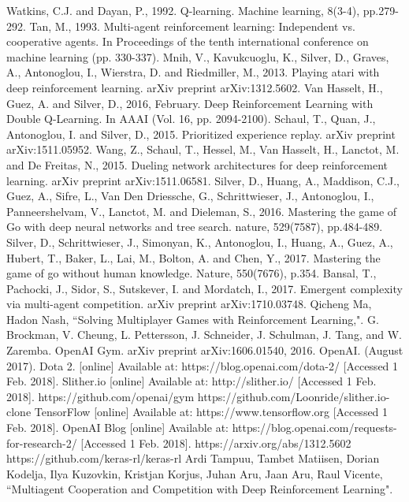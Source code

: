 \documentclass[conference,10pt]{IEEEtran}
\begin{document}
\begin{thebibliography}{00}
 Watkins, C.J. and Dayan, P., 1992. Q-learning. Machine learning, 8(3-4), pp.279-292.
 Tan, M., 1993. Multi-agent reinforcement learning: Independent vs. cooperative agents. In Proceedings of the tenth international conference on machine learning (pp. 330-337).
 Mnih, V., Kavukcuoglu, K., Silver, D., Graves, A., Antonoglou, I., Wierstra, D. and Riedmiller, M., 2013. Playing atari with deep reinforcement learning. arXiv preprint arXiv:1312.5602.
 Van Hasselt, H., Guez, A. and Silver, D., 2016, February. Deep Reinforcement Learning with Double Q-Learning. In AAAI (Vol. 16, pp. 2094-2100).
 Schaul, T., Quan, J., Antonoglou, I. and Silver, D., 2015. Prioritized experience replay. arXiv preprint arXiv:1511.05952.
 Wang, Z., Schaul, T., Hessel, M., Van Hasselt, H., Lanctot, M. and De Freitas, N., 2015. Dueling network architectures for deep reinforcement learning. arXiv preprint arXiv:1511.06581.
 Silver, D., Huang, A., Maddison, C.J., Guez, A., Sifre, L., Van Den Driessche, G., Schrittwieser, J., Antonoglou, I., Panneershelvam, V., Lanctot, M. and Dieleman, S., 2016. Mastering the game of Go with deep neural networks and tree search. nature, 529(7587), pp.484-489.
 Silver, D., Schrittwieser, J., Simonyan, K., Antonoglou, I., Huang, A., Guez, A., Hubert, T., Baker, L., Lai, M., Bolton, A. and Chen, Y., 2017. Mastering the game of go without human knowledge. Nature, 550(7676), p.354.
 Bansal, T., Pachocki, J., Sidor, S., Sutskever, I. and Mordatch, I., 2017. Emergent complexity via multi-agent competition. arXiv preprint arXiv:1710.03748.
 Qicheng Ma, Hadon Nash, ``Solving Multiplayer Games with Reinforcement Learning,".
 G. Brockman, V. Cheung, L. Pettersson, J. Schneider, J. Schulman, J. Tang, and W. Zaremba. OpenAI Gym. arXiv preprint arXiv:1606.01540, 2016.
 OpenAI. (August 2017). Dota 2. [online] Available at: https://blog.openai.com/dota-2/ [Accessed 1 Feb. 2018].
 Slither.io [online] Available at: http://slither.io/ [Accessed 1 Feb. 2018].
https://github.com/openai/gym
https://github.com/Loonride/slither.io-clone
 TensorFlow [online] Available at: https://www.tensorflow.org [Accessed 1 Feb. 2018].
 OpenAI Blog [online] Available at: https://blog.openai.com/requests-for-research-2/ [Accessed 1 Feb. 2018].
https://arxiv.org/abs/1312.5602
https://github.com/keras-rl/keras-rl
Ardi Tampuu, Tambet Matiisen, Dorian Kodelja, Ilya Kuzovkin, Kristjan Korjus, Juhan Aru, Jaan Aru, Raul Vicente, ``Multiagent Cooperation and Competition with Deep Reinforcement Learning".
\end{thebibliography}
\end{document}
